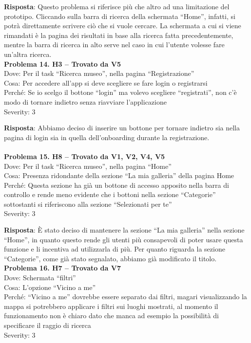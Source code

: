\documentclass{article}
\begin{document}
\noindent \textbf{Risposta}: Questo problema si riferisce più che altro ad una limitazione del prototipo. Cliccando sulla barra di ricerca della schermata “Home”, infatti, si potrà direttamente scrivere ciò che si vuole cercare. La schermata a cui si viene rimandati è la pagina dei risultati in base alla ricerca fatta precedentemente, mentre la barra di ricerca in alto serve nel caso in cui l’utente volesse fare un’altra ricerca.\\

\noindent \textbf{Problema 14. H3 – Trovato da V5} \\
Dove: Per il task “Ricerca museo”, nella pagina “Registrazione” \\
Cosa: Per accedere all’app si deve scegliere se fare login o registrarsi \\
Perché: Se io scelgo il bottone “login” ma volevo scegliere “registrati”, non c’è modo di tornare indietro senza riavviare l’applicazione \\
Severity: 3

\noindent \textbf{Risposta}: Abbiamo deciso di inserire un bottone per tornare indietro sia nella pagina di login sia in quella dell’onboarding durante la registrazione. \\ \\

\noindent \textbf{Problema 15. H8 – Trovato da V1, V2, V4, V5} \\
Dove: Per il task “Ricerca museo”, nella pagina “Home” \\
Cosa: Presenza ridondante della sezione “La mia galleria” della pagina Home \\
Perché: Questa sezione ha già un bottone di accesso apposito nella barra di controllo e rende meno evidente che i bottoni nella sezione “Categorie” sottostanti si riferiscono alla sezione “Selezionati per te” \\
Severity: 3  

\noindent \textbf{Risposta}: È stato deciso di mantenere la sezione “La mia galleria” nella sezione “Home”, in quanto questo rende gli utenti più consapevoli di poter usare questa funzione e li incentiva ad utilizzarla di più. Per quanto riguarda la sezione “Categorie”, come già stato segnalato, abbiamo già modificato il titolo.\\

\noindent \textbf{Problema 16. H7 – Trovato da V7} \\
Dove: Schermata “filtri” \\
Cosa: L’opzione “Vicino a me” \\
Perché: “Vicino a me” dovrebbe essere separato dai filtri, magari visualizzando la mappa si potrebbero applicare i filtri sui luoghi mostrati, al momento il funzionamento non è chiaro dato che manca ad esempio la possibilità di specificare il raggio di ricerca \\
Severity: 3
\end{document}
